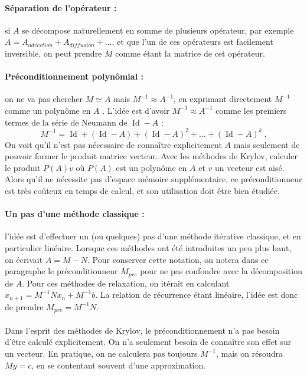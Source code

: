 		\paragraph{Séparation de l'opérateur :}
		si $A$ se décompose naturellement en somme de plusieurs opérateur, par exemple $A = A_{advection} + A_{diffusion} + \dots$, et que l'un de ces opérateurs est facilement inversible,
		on peut prendre $M$ comme étant la matrice de cet opérateur.

		\paragraph{Préconditionnement polynômial :}
		on ne va pas chercher $M\simeq A$ mais $M^{-1} \approx A^{-1}$, en exprimant directement $M^{-1}$ comme un polynôme en $A$ \cite{DuboisGreenbaumRodrigue1979}.
		L'idée est d'avoir $M^{-1} \approx A^{-1}$ comme les premiers termes de la série de Neumann de $\operatorname{Id} - A$ :
		\[M^{-1}=\operatorname{Id}+\left(\operatorname{Id}-A\right)+\left(\operatorname{Id}-A\right)^2 + \dots+\left(\operatorname{Id}-A\right)^k\ .\]
		On voit qu'il n'est pas nécessaire de connaître explicitement $A$ mais seulement de pouvoir former le produit matrice vecteur.
		Avec les méthodes de Krylov, calculer le produit $P\left(A\right)v$ où $P\left(A\right)$ est un polynôme en $A$ et $v$ un vecteur est aisé.
		Alors qu'il ne nécessite pas d'espace mémoire supplémentaire, ce préconditionneur est très coûteux en temps de calcul, et son utilisation doit être bien étudiée.

		\paragraph{Un pas d'une méthode classique :}
		l'idée est d'effectuer un (ou quelques) pas d'une méthode itérative classique, et en particulier linéaire.
		Lorsque ces méthodes ont été introduites un peu plus haut, on écrivait $A = M - N$.
		Pour conserver cette notation, on notera dans ce paragraphe le préconditionneur $M_{pre}$ pour ne pas confondre avec la décomposition de $A$.
		Pour ces méthodes de relaxation, on itérait en calculant $x_{n+1} = M^{-1}Nx_n + M^{-1}b$.
    La relation de récurrence étant linéaire, l'idée est donc de prendre $M_{pre} = M^{-1}N$.

		\paragraph{}
		Dans l'esprit des méthodes de Krylov, le préconditionnement n'a pas besoin d'être calculé explicitement.
		On n'a seulement besoin de connaître son effet sur un vecteur.
		En pratique, on ne calculera pas toujours $M^{-1}$, mais on résoudra $My = c$, en se contentant souvent d’une approximation.


